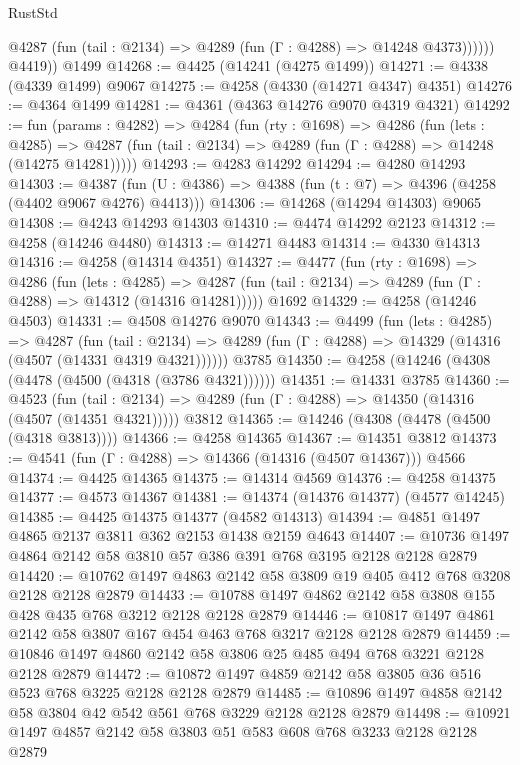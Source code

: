 \begin{lexlean}{RustStd}
\begin{coremodule}
{\begin{coremodule}
{{{{{{{{{{{{{{{{              @4287 (fun (tail : @2134) => @4289 (fun (Γ : @4288) => @14248 @4373))))))
        @4419))
    @1499
@14268 := @4425 (@14241 (@4275 @1499))
@14271 := @4338 (@4339 @1499) @9067
@14275 := @4258 (@4330 (@14271 @4347) @4351)
@14276 := @4364 @1499
@14281 := @4361 (@4363 @14276 @9070 @4319 @4321)
@14292 := fun (params : @4282) =>
  @4284
    (fun (rty : @1698) =>
    @4286
      (fun (lets : @4285) =>
      @4287 (fun (tail : @2134) => @4289 (fun (Γ : @4288) => @14248 (@14275 @14281)))))
@14293 := @4283 @14292
@14294 := @4280 @14293
@14303 := @4387 (fun (U : @4386) => @4388 (fun (t : @7) => @4396 (@4258 (@4402 @9067 @4276) @4413)))
@14306 := @14268 (@14294 @14303) @9065
@14308 := @4243 @14293 @14303
@14310 := @4474 @14292 @2123
@14312 := @4258 (@14246 @4480)
@14313 := @14271 @4483
@14314 := @4330 @14313
@14316 := @4258 (@14314 @4351)
@14327 := @4477
    (fun (rty : @1698) =>
    @4286
      (fun (lets : @4285) =>
      @4287 (fun (tail : @2134) => @4289 (fun (Γ : @4288) => @14312 (@14316 @14281)))))
    @1692
@14329 := @4258 (@14246 @4503)
@14331 := @4508 @14276 @9070
@14343 := @4499
    (fun (lets : @4285) =>
    @4287
      (fun (tail : @2134) =>
      @4289 (fun (Γ : @4288) => @14329 (@14316 (@4507 (@14331 @4319 @4321))))))
    @3785
@14350 := @4258 (@14246 (@4308 (@4478 (@4500 (@4318 (@3786 @4321))))))
@14351 := @14331 @3785
@14360 := @4523
    (fun (tail : @2134) => @4289 (fun (Γ : @4288) => @14350 (@14316 (@4507 (@14351 @4321)))))
    @3812
@14365 := @14246 (@4308 (@4478 (@4500 (@4318 @3813))))
@14366 := @4258 @14365
@14367 := @14351 @3812
@14373 := @4541 (fun (Γ : @4288) => @14366 (@14316 (@4507 @14367))) @4566
@14374 := @4425 @14365
@14375 := @14314 @4569
@14376 := @4258 @14375
@14377 := @4573 @14367
@14381 := @14374 (@14376 @14377) (@4577 @14245)
@14385 := @4425 @14375 @14377 (@4582 @14313)
@14394 := @4851 @1497 @4865 @2137 @3811 @362 @2153 @1438 @2159 @4643
@14407 := @10736 @1497 @4864 @2142 @58 @3810 @57 @386 @391 @768 @3195 @2128 @2128 @2879
@14420 := @10762 @1497 @4863 @2142 @58 @3809 @19 @405 @412 @768 @3208 @2128 @2128 @2879
@14433 := @10788 @1497 @4862 @2142 @58 @3808 @155 @428 @435 @768 @3212 @2128 @2128 @2879
@14446 := @10817 @1497 @4861 @2142 @58 @3807 @167 @454 @463 @768 @3217 @2128 @2128 @2879
@14459 := @10846 @1497 @4860 @2142 @58 @3806 @25 @485 @494 @768 @3221 @2128 @2128 @2879
@14472 := @10872 @1497 @4859 @2142 @58 @3805 @36 @516 @523 @768 @3225 @2128 @2128 @2879
@14485 := @10896 @1497 @4858 @2142 @58 @3804 @42 @542 @561 @768 @3229 @2128 @2128 @2879
@14498 := @10921 @1497 @4857 @2142 @58 @3803 @51 @583 @608 @768 @3233 @2128 @2128 @2879
}}}}}}}}}}}}}}}}
\end{coremodule}}
\end{coremodule}
\end{lexlean}

